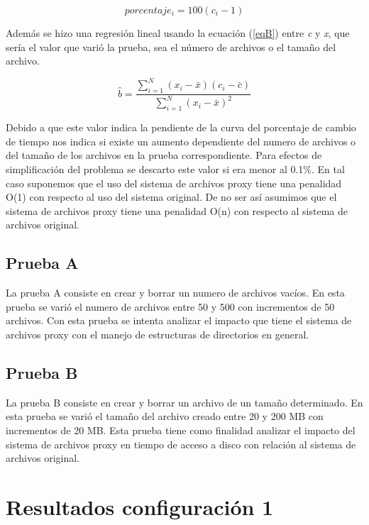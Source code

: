 \begin{equation}
\label{eqC}
porcentaje_{i} = 100(c_{i} - 1)
\end{equation}

Además se hizo una regresión lineal usando la ecuación (\ref{eqB}) entre \textit{c} y \textit{x}, que sería el valor que varió la prueba, sea el número de archivos o el tamaño del archivo.

\begin{equation}
\label{eqB}
\hat{b} = \frac {\sum_{i=1}^{N}  (x_{i} - \bar{x})(c_{i} - \bar{c}) }  {\sum_{i=1}^{N} (x_{i} - \bar{x}) ^2}
\end{equation}

Debido a que este valor indica la pendiente de la curva del porcentaje de cambio de tiempo nos indica si existe un aumento dependiente del numero de archivos o del tamaño de los archivos en la prueba correspondiente. Para efectos de simplificación del problema se descarto este valor si era menor al 0.1\%. En tal caso suponemos que el uso del sistema de archivos proxy tiene una penalidad O(1) con respecto al uso del sistema original. De no ser así asumimos que el sistema de archivos proxy tiene una penalidad O(n) con respecto al sistema de archivos original.

\subsection{Prueba A}

La prueba A consiste en crear y borrar un numero de archivos vacíos. En esta prueba se varió el numero de archivos entre 50 y 500 con incrementos de 50 archivos. Con esta prueba se intenta analizar el impacto que tiene el sistema de archivos proxy con el manejo de estructuras de directorios en general.

\subsection{Prueba B}

La prueba B consiste en crear y borrar un archivo de un tamaño determinado. En esta prueba se varió el tamaño del archivo creado entre 20 y 200 MB con incrementos de 20 MB. Esta prueba tiene como finalidad analizar el impacto del sistema de archivos proxy en tiempo de acceso a disco con relación al sistema de archivos original.


\section{Resultados configuración 1}

